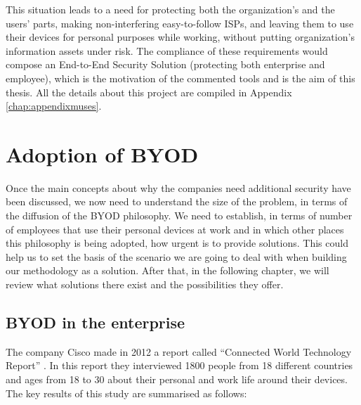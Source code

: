 This situation leads to a need for protecting both the organization's and the users' parts, making non-interfering easy-to-follow ISPs, and leaving them to use their devices for personal purposes while working, without putting organization's information assets under risk. The compliance of these requirements would compose an End-to-End Security Solution (protecting both enterprise and employee), which is the motivation of the commented tools and is the aim of this thesis. All the details about this project are compiled in Appendix \ref{chap:appendixmuses}.

\section{Adoption of BYOD}
\label{sec:byodadoption}

Once the main concepts about why the companies need additional security have been discussed, we now need to understand the size of the problem, in terms of the diffusion of the BYOD philosophy. We need to establish, in terms of number of employees that use their personal devices at work and in which other places this philosophy is being adopted, how urgent is to provide solutions. This could help us to set the basis of the scenario we are going to deal with when building our methodology as a solution. After that, in the following chapter, we will review what solutions there exist and the possibilities they offer.

\subsection{BYOD in the enterprise}
\label{subsec:byodcompany}

The company Cisco made in 2012 a report called ``Connected World Technology Report'' \cite{cisco2012}. In this report they interviewed 1800 people from 18 different countries and ages from 18 to 30 about their personal and work life around their devices. The key results of this study are summarised as follows:


